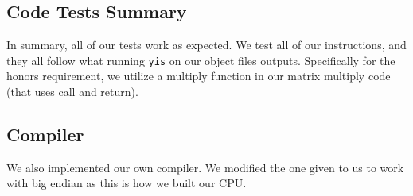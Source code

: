 \documentclass{article}
\begin{document}
\subsection{Code Tests Summary}
In summary, all of our tests work as expected. We test all of our instructions, and they all follow what running \verb+yis+ on our object files outputs. Specifically for the honors requirement, we utilize a multiply function in our matrix multiply code (that uses call and return).
\subsection{Compiler}
We also implemented our own compiler. We modified the one given to us to work with big endian as this is how we built our CPU.
\end{document}
